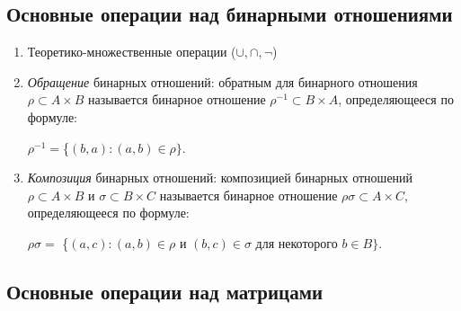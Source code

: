 \documentclass[bachelor, och, labwork]{shiza}
\begin{document}
\subsection{Основные операции над бинарными отношениями}

\begin{enumerate}
	\item Теоретико-множественные операции ($\cup, \cap, \neg$)
	\item \textit{Обращение} бинарных отношений: обратным для бинарного отношения $\rho \subset A \times B$ называется бинарное
	отношение $\rho^{-1} \subset B \times A$, определяющееся по формуле:

		$\rho^{-1} = $\{$(b, a) : (a, b) \in \rho \}$.

	\item \textit{Композиция} бинарных отношений: композицией бинарных отношений $\rho \subset A \times B$ и $\sigma \subset B \times C$
	называется бинарное отношение $\rho\sigma \subset A \times C$, определяющееся по формуле:

		$\rho\sigma = $ \{$(a, c) : (a, b) \in \rho \text{ и } (b, c) \in \sigma \text{ для некоторого } b \in B
		\}$.

\end{enumerate}
	
\subsection{Основные операции над матрицами}
\end{document}

